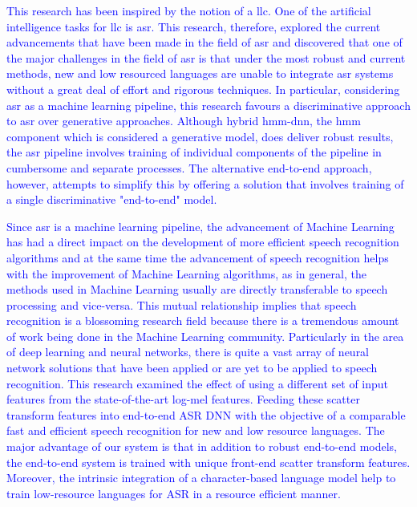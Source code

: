 \textcolor{blue}{This research has been inspired by the notion of a \acrfull{llc}.  One of the artificial intelligence tasks for \acrshort{llc} is \acrfull{asr}.  This research, therefore, explored the current advancements that have been made in the field of \acrshort{asr} and discovered that one of the major challenges in the field of \acrshort{asr} is that under the most robust and current methods, new and low resourced languages are unable to integrate \acrshort{asr} systems without a great deal of effort and rigorous techniques.  In particular, considering \acrshort{asr} as a machine learning pipeline, this research favours a discriminative approach to \acrshort{asr} over generative approaches.  Although hybrid \acrshort{hmm}-\acrshort{dnn}, the hmm component which is considered a generative model, does deliver robust results, the \acrshort{asr} pipeline involves training of individual components of the pipeline in cumbersome and separate processes.  The alternative end-to-end approach, however, attempts to simplify this by offering a solution that involves training of a single discriminative "end-to-end" model.


Since \acrshort{asr} is a machine learning pipeline,  the advancement of Machine Learning has had a direct impact on the development of more efficient speech recognition algorithms and at the same time the advancement of speech recognition helps with the improvement of Machine Learning algorithms, as in general, the methods used in Machine Learning usually are directly transferable to speech processing and vice-versa. This mutual relationship implies that speech recognition is a blossoming research field because there is a tremendous amount of work being done in the Machine Learning community. Particularly in the area of deep learning and neural networks, there is quite a vast array of neural network solutions that have been applied or are yet to be applied to speech recognition. This research examined the effect of using a different set of input features from the state-of-the-art log-mel features. Feeding these scatter transform features into end-to-end ASR DNN with the objective of a comparable fast and efficient speech recognition for new and low resource languages. The major advantage of our system is that in addition to robust end-to-end models, the end-to-end system is trained with unique front-end scatter transform features. Moreover, the intrinsic integration of a character-based language model help to train low-resource languages for ASR in a resource efficient manner. 

}
